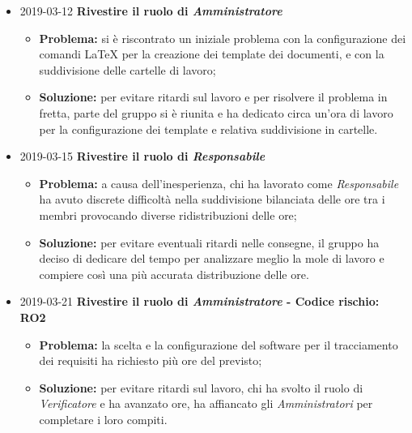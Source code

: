 \begin{itemize}

		\item 2019-03-12 \textbf{Rivestire il ruolo di \textit{Amministratore}} \\
		\begin{itemize}
			\item \textbf{Problema:} si è riscontrato un iniziale problema con la configurazione dei comandi \LaTeX{} per la creazione dei template dei documenti, e con la suddivisione delle cartelle di lavoro;
			\item \textbf{Soluzione:} per evitare ritardi sul lavoro e per risolvere il problema in fretta, parte del gruppo si è riunita e ha dedicato circa un'ora di lavoro per la configurazione dei template e relativa suddivisione in cartelle.
		\end{itemize}	
		
		\item 2019-03-15 \textbf{Rivestire il ruolo di \textit{Responsabile}} \\
		\begin{itemize}
			\item \textbf{Problema:} a causa dell'inesperienza, chi ha lavorato come \textit{Responsabile} ha avuto discrete
		difficoltà nella suddivisione bilanciata delle ore tra i membri provocando 
		diverse ridistribuzioni delle ore;
			\item \textbf{Soluzione:} per evitare eventuali ritardi nelle consegne, il gruppo ha deciso di dedicare 
		del tempo per analizzare meglio la mole di lavoro e compiere così una più
		accurata distribuzione delle ore.
		\end{itemize}
		
						
		\item 2019-03-21 \textbf{Rivestire il ruolo di \textit{Amministratore} - Codice rischio: RO2} \\
		\begin{itemize}
			\item \textbf{Problema:} la scelta e la configurazione del software per il tracciamento dei requisiti
		ha richiesto più ore del previsto;
			\item \textbf{Soluzione:} per evitare ritardi sul lavoro, chi ha svolto il ruolo di \textit{Verificatore}
		e ha avanzato ore, ha affiancato gli \textit{Amministratori} per completare 
		i loro compiti.
		\end{itemize}
		
\end{itemize}
